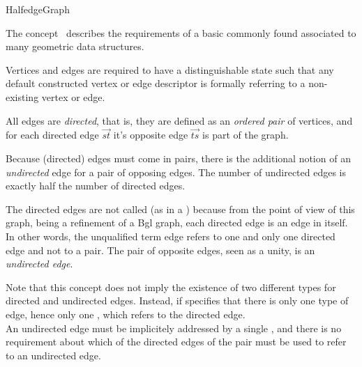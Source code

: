 
\begin{ccRefConcept}{HalfedgeGraph}


\ccDefinition

The concept \ccRefName\ describes the requirements of a basic
commonly found associated to many geometric data structures.


Vertices and edges are required to have a distinguishable  state 
such that any default constructed vertex or edge descriptor is formally
referring to a non-existing vertex or edge.

All edges are {\em directed}, that is, they are defined as an {\em ordered pair} 
of vertices, and for each directed edge $\overrightarrow{st}$
it's opposite edge $\overrightarrow{ts}$ is part of the graph.

Because (directed) edges must come in pairs, there is the additional
notion of an {\em undirected} edge for a pair of opposing edges.
The number of undirected edges is exactly half the number of directed edges.

The directed edges are not called  (as in a
) because from the point of view of this graph, being
a refinement of a {\sc Bgl} graph, each directed edge is an
edge in itself. In other words, the unqualified term edge
refers to one and only one directed edge and not to a pair. The
pair of opposite edges, seen as a unity, is an {\em undirected edge}.
 
Note that this concept does not imply the existence of two different types
for directed and undirected edges. Instead, if specifies that there is only one type of edge,
hence only one , which refers to the directed edge.\\
An undirected edge must be implicitely addressed by a single ,
and there is no requirement about which of the directed edges of the pair must
be used to refer to an undirected edge.


\end{ccRefConcept}
